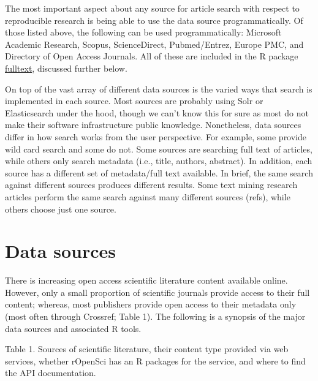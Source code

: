 \documentclass[author-year, review, 11pt]{components/elsarticle} %
\begin{document}
The most important aspect about any source for article search with
respect to reproducible research is being able to use the data source
programmatically. Of those listed above, the following can be used
programmatically: Microsoft Academic Research, Scopus, ScienceDirect,
Pubmed/Entrez, Europe PMC, and Directory of Open Access Journals. All of
these are included in the R package
\href{https://github.com/ropensci/fulltext}{fulltext}, discussed further
below.

On top of the vast array of different data sources is the varied ways
that search is implemented in each source. Most sources are probably
using Solr or Elasticsearch under the hood, though we can't know this
for sure as most do not make their software infrastructure public
knowledge. Nonetheless, data sources differ in how search works from the
user perspective. For example, some provide wild card search and some do
not. Some sources are searching full text of articles, while others only
search metadata (i.e., title, authors, abstract). In addition, each
source has a different set of metadata/full text available. In brief,
the same search against different sources produces different results.
Some text mining research articles perform the same search against many
different sources (refs), while others choose just one source.

\hypertarget{data-sources}{%
\section{Data sources}\label{data-sources}}

There is increasing open access scientific literature content available
online. However, only a small proportion of scientific journals provide
access to their full content; whereas, most publishers provide open
access to their metadata only (most often through Crossref; Table 1).
The following is a synopsis of the major data sources and associated R
tools.

\newpage

Table 1. Sources of scientific literature, their content type provided
via web services, whether rOpenSci has an R packages for the service,
and where to find the API documentation.
\end{document}
